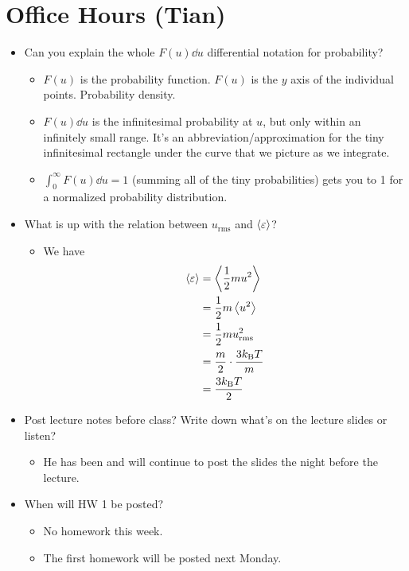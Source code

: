 \documentclass[../notes.tex]{subfiles}
\begin{document}
\section{Office Hours (Tian)}
\begin{itemize}
    \item Can you explain the whole $F(u)\dd{u}$ differential notation for probability?
    \begin{itemize}
        \item $F(u)$ is the probability function. $F(u)$ is the $y$ axis of the individual points. Probability density.
        \item $F(u)\dd{u}$ is the infinitesimal probability at $u$, but only within an infinitely small range. It's an abbreviation/approximation for the tiny infinitesimal rectangle under the curve that we picture as we integrate.
        \item $\int_0^\infty F(u)\dd{u}=1$ (summing all of the tiny probabilities) gets you to 1 for a normalized probability distribution.
    \end{itemize}
    \item What is up with the relation between $u_\text{rms}$ and $\left\langle{\varepsilon}\right\rangle$?
    \begin{itemize}
        \item We have
        \begin{align*}
            \left\langle{\varepsilon}\right\rangle &= \left\langle{\frac{1}{2}mu^2}\right\rangle\\
            &= \frac{1}{2}m\left\langle{u^2}\right\rangle\\
            &= \frac{1}{2}mu_\text{rms}^2\\
            &= \frac{m}{2}\cdot\frac{3k_\text{B} T}{m}\\
            &= \frac{3k_\text{B} T}{2}
        \end{align*}
    \end{itemize}
    \item Post lecture notes before class? Write down what's on the lecture slides or listen?
    \begin{itemize}
        \item He has been and will continue to post the slides the night before the lecture.
    \end{itemize}
    \item When will HW 1 be posted?
    \begin{itemize}
        \item No homework this week.
        \item The first homework will be posted next Monday.

\end{itemize}
\end{itemize}
\end{document}
